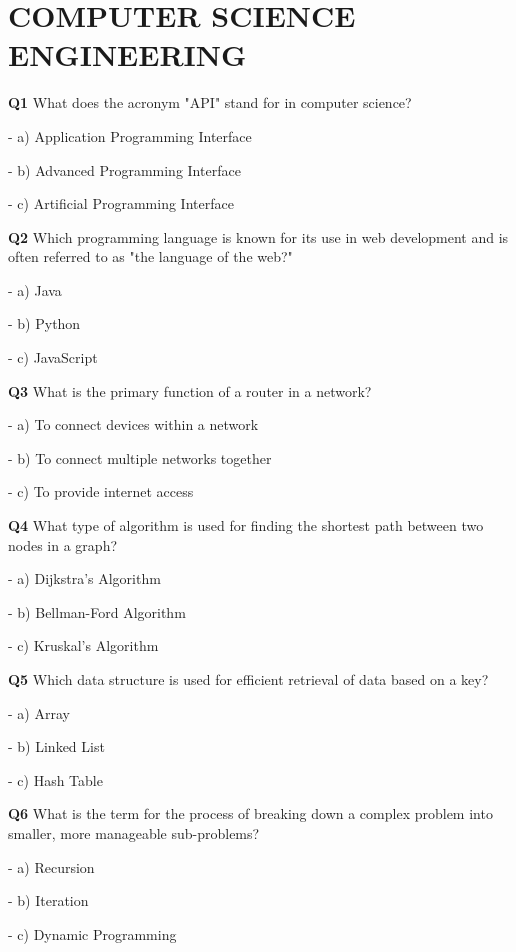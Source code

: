 \section{COMPUTER SCIENCE ENGINEERING}

\textbf{Q1} What does the acronym "API" stand for in computer science?\par
\quad - a) Application Programming Interface\par
\quad - b) Advanced Programming Interface\par
\quad - c) Artificial Programming Interface\par

\textbf{Q2} Which programming language is known for its use in web development and is often referred to as "the language of the web?"\par
\quad - a) Java\par
\quad - b) Python\par
\quad - c) JavaScript\par

\textbf{Q3} What is the primary function of a router in a network?\par
\quad - a) To connect devices within a network\par
\quad - b) To connect multiple networks together\par
\quad - c) To provide internet access\par

\textbf{Q4} What type of algorithm is used for finding the shortest path between two nodes in a graph?\par
\quad - a) Dijkstra's Algorithm\par
\quad - b) Bellman-Ford Algorithm\par
\quad - c) Kruskal's Algorithm\par

\textbf{Q5} Which data structure is used for efficient retrieval of data based on a key?\par
\quad - a) Array\par
\quad - b) Linked List\par
\quad - c) Hash Table\par

\textbf{Q6} What is the term for the process of breaking down a complex problem into smaller, more manageable sub-problems?\par
\quad - a) Recursion\par
\quad - b) Iteration\par
\quad - c) Dynamic Programming\par


